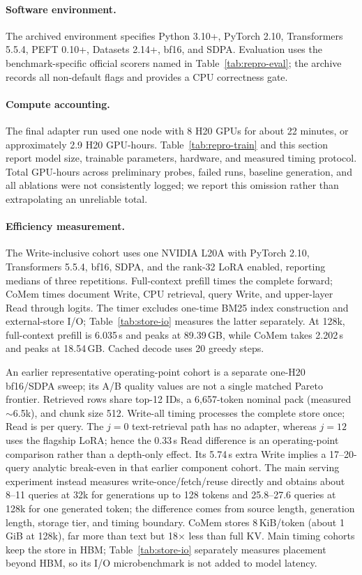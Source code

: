 \paragraph{Software environment.}
The archived environment specifies Python 3.10+, PyTorch 2.10,
Transformers 5.5.4, PEFT 0.10+, Datasets 2.14+, bf16, and SDPA. Evaluation uses
the benchmark-specific official scorers named in Table~\ref{tab:repro-eval}; the
archive records all non-default flags and provides a CPU correctness gate.

\paragraph{Compute accounting.}
The final adapter run used one node with 8 H20 GPUs for about 22 minutes, or
approximately 2.9 H20 GPU-hours. Table~\ref{tab:repro-train} and this section
report model size, trainable parameters, hardware, and measured timing protocol.
Total GPU-hours across preliminary probes, failed runs, baseline generation, and
all ablations were not consistently logged; we report this omission rather than
extrapolating an unreliable total.

\paragraph{Efficiency measurement.}
\label{app:efficiency}
The Write-inclusive cohort uses one NVIDIA L20A with PyTorch 2.10,
Transformers 5.5.4, bf16, SDPA, and the rank-32 LoRA enabled, reporting medians
of three repetitions. Full-context prefill times the complete forward; CoMem
times document Write, CPU retrieval, query Write, and upper-layer Read through
logits. The timer excludes one-time BM25 index construction and external-store
I/O; Table~\ref{tab:store-io} measures the latter separately. At 128k,
full-context prefill is 6.035\,s and peaks at 89.39\,GB, while CoMem takes
2.202\,s and peaks at 18.54\,GB. Cached decode uses 20 greedy steps.

An earlier representative operating-point cohort is a separate one-H20
bf16/SDPA sweep; its A/B quality values are not a single matched Pareto
frontier. Retrieved rows share top-12 IDs, a 6,657-token nominal pack
(measured $\sim$6.5k), and chunk size 512. Write-all timing processes the
complete store once; Read is per query. The $j{=}0$ text-retrieval path has no
adapter, whereas $j{=}12$ uses the flagship LoRA; hence the 0.33\,s Read
difference is an operating-point comparison rather than a depth-only effect.
Its 5.74\,s extra Write implies a 17--20-query analytic break-even in that
earlier component cohort.
The main serving experiment instead measures write-once/fetch/reuse directly
and obtains about 8--11 queries at 32k for generations up to 128 tokens and
25.8--27.6 queries at 128k for one generated token; the difference comes from
source length, generation length, storage tier, and timing boundary.
CoMem stores 8\,KiB/token (about
1\,GiB at 128k), far more than text but 18$\times$ less than full KV. Main timing
cohorts keep the store in HBM; Table~\ref{tab:store-io} separately measures
placement beyond HBM, so its I/O microbenchmark is not added to model latency.

